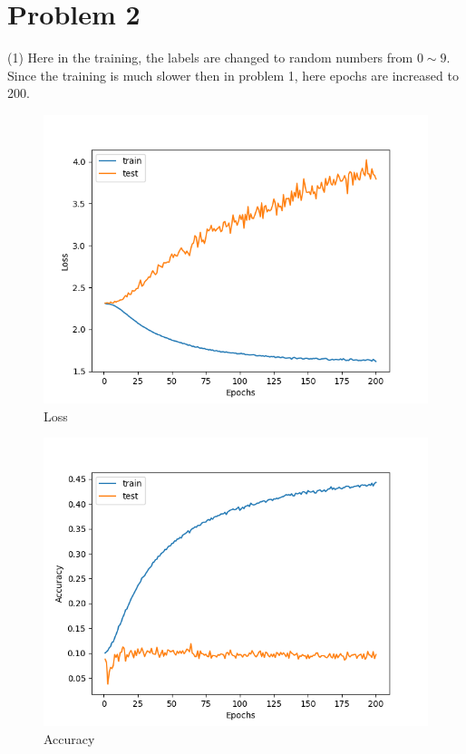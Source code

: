 \documentclass[12pt]{article}
\begin{document}
\section{Problem 2}
(1) Here in the training, the labels are changed to random numbers from
$0\sim9$. Since the training is much slower then in problem 1, here
epochs are increased to 200.\\
\begin{figure}[h]
    \centering
    \includegraphics [scale=0.5]{Figure_2.png}
    \caption {Loss}
\end{figure}
\begin{figure}[h]
    \centering
    \includegraphics [scale=0.5]{Figure_3.png}
    \caption {Accuracy}
\end{figure}
\end{document}
